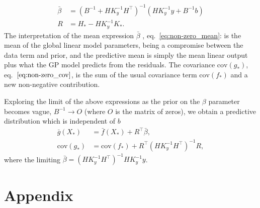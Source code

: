 \documentclass{article}[12pt]
\newcommand{\cov}{\mathrm{cov}}
\begin{document}
\begin{equation}
\begin{aligned}
\bar{\beta} &= (B^{-1} + H K_y^{-1}H^\top)^{-1} (H K_y^{-1}y + B^{-1}b)\\
R &= H_* - H K_y^{-1}K_*.
\end{aligned}
\end{equation}
The interpretation of the mean expression $\bar{\beta}$ , eq.~\eqref{eq:non-zero_mean}: is
the mean of the global linear model parameters, being a compromise between
the data term and prior, and the predictive mean is simply the mean linear
output plus what the GP model predicts from the residuals. The covariance $\cov(g_*)$, eq.~$\eqref{eq:non-zero_cov}$, is
the sum of the usual covariance term $\cov(f_*)$ and a new non-negative contribution.

Exploring the limit of the above expressions as the prior on the $\beta$ parameter becomes vague, $B^{-1}\to O$ (where $O$ is the matrix of zeros), we obtain a
predictive distribution which is independent of $b$
\begin{align}
\bar{g}(X_*) &=
\bar{f}(X_*)+R^\top \bar{\beta},\\
\cov(g_*) &= \cov(f_*) + R^\top (H K_y^{-1}H^\top)^{-1} R,
\end{align}
where the limiting $\bar{\beta}= (H K_y^{-1}H^\top)^{-1} H K_y^{-1}y$.



\newpage



\newpage
\appendix
\section{Appendix}
\end{document}
